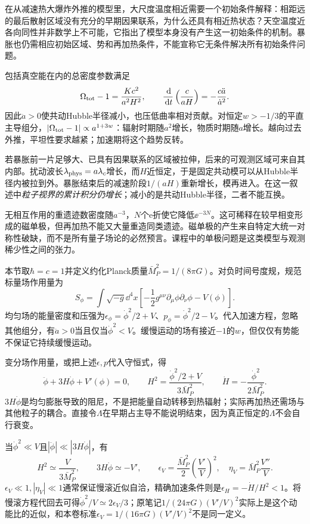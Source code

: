 在从减速热大爆炸外推的模型里，大尺度温度相近需要一个初始条件解释：相距远的最后散射区域没有充分的早期因果联系，为什么还具有相近热状态？天空温度近各向同性并非数学上不可能，它指出了模型本身没有产生这一初始条件的机制。暴胀也仍需相应初始区域、势和再加热条件，不能宣称它无条件解决所有初始条件问题。

包括真空能在内的总密度参数满足
\[
 \Omega_{\rm tot}-1=\frac{Kc^2}{a^2H^2},\qquad
 \frac{\,\mathrm d}{\,\mathrm d t}\left(\frac c{aH}\right)=-\frac{c\ddot a}{\dot a^2}.
\]
因此$\ddot a>0$使共动Hubble半径减小，也压低曲率相对贡献。对恒定$w>-1/3$的平直主导组分，$|\Omega_{\rm tot}-1|\propto a^{1+3w}$：辐射时期随$a^2$增长，物质时期随$a$增长。越向过去外推，平坦性要求越紧；加速期将这个趋势反转。

若暴胀前一片足够大、已具有因果联系的区域被拉伸，后来的可观测区域可来自其内部。扰动波长$\lambda_{\rm phys}=a\lambda_c$增长，而$H$近恒定，于是固定共动模可以从Hubble半径内被拉到外。暴胀结束后的减速阶段$1/(aH)$重新增长，模再进入。在这一叙述中\emph{粒子视界的累计积分仍增长}；减小的是共动Hubble半径，二者不能互换。

无相互作用的重遗迹数密度随$a^{-3}$，$N$个e折使它降低$\ee^{-3N}$。这可稀释在较早相变形成的磁单极，但再加热不能又大量重造同类遗迹。磁单极的产生来自特定大统一对称性破缺，而不是所有量子场论的必然预言。课程中的单极问题是这类模型与观测稀少性之间的张力。

本节取$\hbar=c=1$并定义约化Planck质量$\bar M_P^2=1/(8\pi G)$。对负时间号度规，规范标量场作用量为
\[
 S_\phi=\int\sqrt{-g}\dd^4x\left[-\frac12g^{\mu\nu}\partial_\mu\phi\partial_\nu\phi-V(\phi)\right].
\]
均匀场的能量密度和压强为$\epsilon_\phi=\dot\phi^2/2+V$、$p_\phi=\dot\phi^2/2-V$。代入加速方程，忽略其他组分，有$\ddot a>0$当且仅当$\dot\phi^2<V$。缓慢运动的场有接近$-1$的$w$，但仅仅有势能不保证它持续缓慢运动。

变分场作用量，或把上述$\epsilon,p$代入守恒式，得
\begin{equation}\label{eq:astro-inflaton}
 \ddot\phi+3H\dot\phi+V'(\phi)=0,\qquad
 H^2=\frac{\dot\phi^2/2+V}{3\bar M_P^2},\qquad
 \dot H=-\frac{\dot\phi^2}{2\bar M_P^2}.
\end{equation}
$3H\dot\phi$是均匀膨胀导致的阻尼，不是把能量自动转移到热辐射；实际再加热还需场与其他粒子的耦合。直接令$\Lambda$在早期占主导不能说明结束，因为真正恒定的$\Lambda$不会自行衰变。

当$\dot\phi^2\ll V$且$|\ddot\phi|\ll|3H\dot\phi|$，有
\[
 H^2\simeq\frac V{3\bar M_P^2},\qquad 3H\dot\phi\simeq-V',\qquad
 \epsilon_V=\frac{\bar M_P^2}{2}\left(\frac{V'}V\right)^2,\quad
 \eta_V=\bar M_P^2\frac{V''}V.
\]
$\epsilon_V\ll1,|\eta_V|\ll1$通常保证慢滚近似自洽，精确加速条件则是$\epsilon_H=-\dot H/H^2<1$。将慢滚方程代回去可得$\dot\phi^2/V\simeq2\epsilon_V/3$；原笔记$1/(24\pi G)(V'/V)^2$实际上是这个动能比的近似，和本卷标准$\epsilon_V=1/(16\pi G)(V'/V)^2$不是同一定义。

